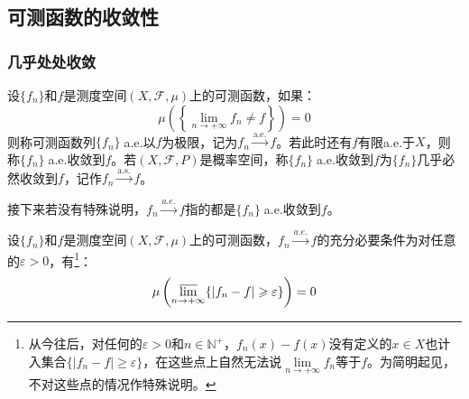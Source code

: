 \subsection{可测函数的收敛性}
\subsubsection{几乎处处收敛}
\begin{definition}
	设$\{f_n\}$和$f$是测度空间$(X,\mathscr{F},\mu)$上的可测函数，如果：
	\begin{equation*}
		\mu\left(\left\{\lim_{n\to+\infty}f_n\ne f\right\}\right)=0
	\end{equation*}
	则称可测函数列$\{f_n\}\;$a.e.以$f$为极限，记为$f_n\overset{\text{a.e.}}{\longrightarrow}f$。若此时还有$f$有限a.e.于$X$，则称$\{f_n\}\;$a.e.收敛到$f$。若$(X,\mathscr{F},P)$是概率空间，称$\{f_n\}\;$a.e.收敛到$f$为$\{f_n\}$几乎必然收敛到$f$，记作$f_n\overset{\text{a.s.}}{\longrightarrow}f$。
\end{definition}
\begin{note}
	接下来若没有特殊说明，$f_n\overset{a.e.}{\longrightarrow}f$指的都是$\{f_n\}\;$a.e.收敛到$f$。
\end{note}
\begin{theorem}\label{theo:EquiConditiona.e.}
	设$\{f_n\}$和$f$是测度空间$(X,\mathscr{F},\mu)$上的可测函数，$f_n\overset{a.e.}{\longrightarrow}f$的充分必要条件为对任意的$\varepsilon>0$，有\footnote{从今往后，对任何的$\varepsilon>0$和$n\in\mathbb{N}^+$，$f_n(x)-f(x)$没有定义的$x\in X$也计入集合$\{|f_n-f|\geqslant\varepsilon\}$，在这些点上自然无法说$\lim\limits_{n\to+\infty}f_n$等于$f$。为简明起见，不对这些点的情况作特殊说明。}：
	\begin{equation*}
		\mu\left(\varlimsup_{n\to+\infty}\{|f_n-f|\geqslant\varepsilon\}\right)=0
	\end{equation*}
\end{theorem}
